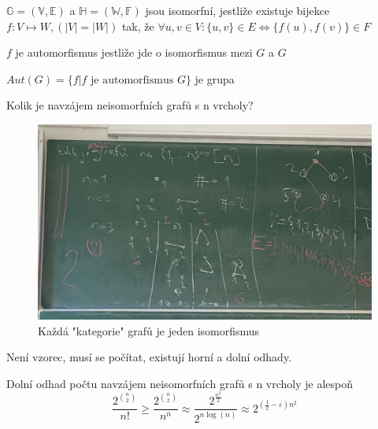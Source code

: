 \documentclass[../main.tex]{subfiles}
\begin{document}
\begin{definition}
    $\mathbb{G} = (\mathbb{V}, \mathbb{E})$ a $\mathbb{H} = (\mathbb{W}, \mathbb{F})$ jsou isomorfní, jestliže existuje bijekce 
    $f: V \mapsto W, (|V| = |W|)$ tak, že $\forall u,v \in V: \{u, v\}\in E \Leftrightarrow \{ f(u), f(v) \} \in F$
\end{definition}


\begin{definition}
    $f$ je automorfismus jestliže jde o isomorfismus mezi $G$ a $G$ 
\end{definition}

\begin{remark}
    $Aut(G) = \{f | f\text{ je automorfismus }G\}$ je grupa
\end{remark}


\begin{example}
    Kolik je navzájem neisomorfních grafů s n vrcholy?

    \begin{figure}[H]
        \centering        
        \includegraphics[width=\textwidth/2]{images/27-9-pocetgrafu.png}
        \caption*{Každá "kategorie" grafů je jeden isomorfismus}
    \end{figure} 

    Není vzorec, musí se počítat, existují horní a dolní odhady.
\end{example}

\begin{claim}
Dolní odhad počtu navzájem neisomorfních grafů s n vrcholy je alespoň
\begin{equation}
    \frac{2^{\binom{n}{2}}}{n!} \geq \frac{2^{\binom{n}{2}}}{n^n} \approx \frac{2^{\frac{n^2}{2}}}{2^{n \log(n)}} \approx 2^{(\frac{1}{2} - \varepsilon)n^2} 
\end{equation}
\end{claim}
\end{document}
